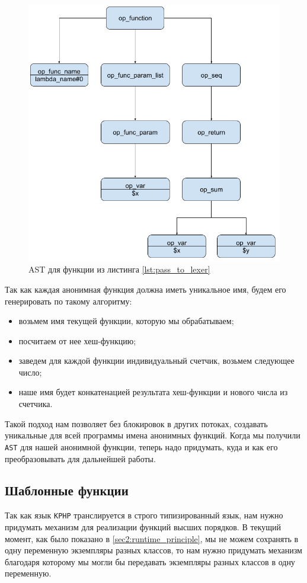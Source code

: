 \begin{figure}[H]
    \caption{AST для функции из листинга \ref{lst:pass_to_lexer}}
    \label{fig:AST_for_sum}
    \centering
    \includegraphics[width=\linewidth]{images/ast_for_id}
\end{figure}

Так как каждая анонимная функция должна иметь уникальное имя, будем его генерировать по такому алгоритму:
\begin{itemize}
  \item возьмем имя текущей функции, которую мы обрабатываем;
  \item посчитаем от нее хеш-функцию;
  \item заведем для каждой функции индивидуальный счетчик, возьмем следующее число;
  \item наше имя будет конкатенацией результата хеш-функции и нового числа из счетчика.
\end{itemize}

Такой подход нам позволяет без блокировок в других потоках, создавать уникальные для всей программы имена анонимных функций.
Когда мы получили \verb|AST| для нашей анонимной функции, теперь надо придумать, куда и как его преобразовывать для дальнейшей работы.

\subsection{Шаблонные функции}
Так как язык \verb|KPHP| транслируется в строго типизированный язык, нам нужно придумать механизм для реализации функций высших порядков.
В текущий момент, как было показано в \ref{sec2:runtime_principle}, мы не можем сохранять в одну переменную экземпляры разных классов, то нам нужно придумать механизм благодаря которому мы могли бы передавать экземпляры разных классов в одну переменную.


